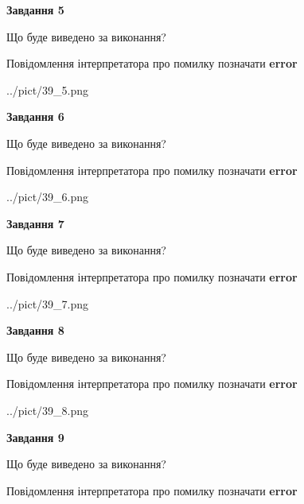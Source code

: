\documentclass[11pt, ukrainian]{article}
\begin{document}
{\begin {large}
{\begin {center}\textbf{Завдання 5}\end {center}}\par
Що буде виведено за виконання? \par
Повідомлення інтерпретатора про помилку позначати \textbf{error}

\begin{center}
	{../pict/39_5.png}
\end{center}
\newpage

{\begin {center}\textbf{Завдання 6}\end {center}}\par
Що буде виведено за виконання? \par
Повідомлення інтерпретатора про помилку позначати \textbf{error}

\begin{center}
	{../pict/39_6.png}
\end{center}
\newpage

{\begin {center}\textbf{Завдання 7}\end {center}}\par
Що буде виведено за виконання? \par
Повідомлення інтерпретатора про помилку позначати \textbf{error}

\begin{center}
	{../pict/39_7.png}
\end{center}
\newpage

{\begin {center}\textbf{Завдання 8}\end {center}}\par
Що буде виведено за виконання? \par
Повідомлення інтерпретатора про помилку позначати \textbf{error}

\begin{center}
	{../pict/39_8.png}
\end{center}
\newpage

{\begin {center}\textbf{Завдання 9}\end {center}}\par
Що буде виведено за виконання? \par
Повідомлення інтерпретатора про помилку позначати \textbf{error}


\end{large}}
\end{document}
